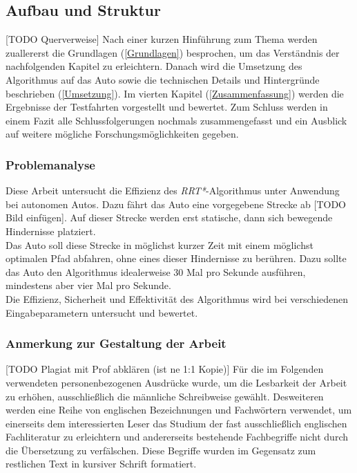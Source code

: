 \subsection{Aufbau und Struktur}
[TODO Querverweise]
Nach einer kurzen Hinführung zum Thema werden zuallererst die Grundlagen (\ref{Grundlagen}) besprochen, um das Verständnis der nachfolgenden Kapitel zu erleichtern. Danach wird die Umsetzung des Algorithmus auf das Auto sowie die technischen Details und Hintergründe beschrieben (\ref{Umsetzung}). Im vierten Kapitel (\ref{Zusammenfassung}) werden die Ergebnisse der Testfahrten vorgestellt und bewertet. Zum Schluss werden in einem Fazit alle Schlussfolgerungen nochmals zusammengefasst und ein Ausblick auf weitere mögliche Forschungsmöglichkeiten gegeben. \\ 
\subsubsection{Problemanalyse}
Diese Arbeit untersucht die Effizienz des\textit{ RRT*}-Algorithmus unter Anwendung bei autonomen Autos. Dazu fährt das Auto eine vorgegebene Strecke ab [TODO Bild einfügen]. Auf dieser Strecke werden erst statische, dann sich bewegende Hindernisse platziert. \\
Das Auto soll diese Strecke in möglichst kurzer Zeit mit einem möglichst optimalen Pfad abfahren, ohne eines dieser Hindernisse zu berühren. Dazu sollte das Auto den Algorithmus idealerweise 30 Mal pro Sekunde ausführen, mindestens aber vier Mal pro Sekunde. \\
Die Effizienz, Sicherheit und Effektivität des Algorithmus wird bei verschiedenen Eingabeparametern untersucht und bewertet. \\

\subsubsection{Anmerkung zur Gestaltung der Arbeit}
[TODO Plagiat mit Prof abklären (ist ne 1:1 Kopie)]
Für die im Folgenden verwendeten personenbezogenen
Ausdrücke wurde, um die Lesbarkeit der Arbeit zu erhöhen,
ausschließlich die männliche Schreibweise gewählt. Desweiteren werden eine
Reihe von englischen Bezeichnungen und Fachwörtern verwendet, um einerseits dem
interessierten Leser das Studium der fast ausschließlich englischen
Fachliteratur zu erleichtern und andererseits bestehende Fachbegriffe nicht durch die Übersetzung zu verfälschen. Diese Begriffe
wurden im Gegensatz zum restlichen Text in kursiver Schrift formatiert.

